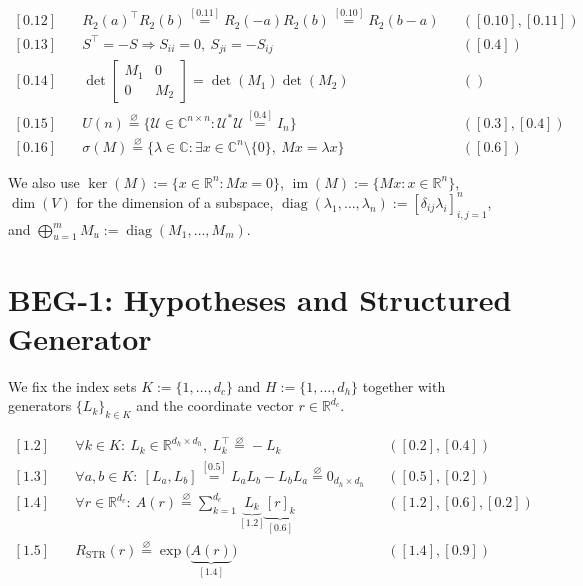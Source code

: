 \documentclass[11pt]{article}
\begin{document}
\begin{align}
\boxed{[0.12]}\quad & R_2(a)^\top R_2(b) \overset{[0.11]}{=} R_2(-a)R_2(b) \overset{[0.10]}{=} R_2(b-a) &&([0.10],[0.11])\\
\boxed{[0.13]}\quad & S^\top = -S \Longrightarrow S_{ii}=0,\ S_{ji}=-S_{ij} &&([0.4])\\
\boxed{[0.14]}\quad & \det \begin{bmatrix}M_1&0\\0&M_2\end{bmatrix} = \det(M_1)\det(M_2) &&({})\\
\boxed{[0.15]}\quad & U(n) \overset{\varnothing}{=} \Big\{\mathcal{U} \in \mathbb{C}^{n\times n} : \mathcal{U}^\ast \mathcal{U} \overset{[0.4]}{=} I_n\Big\} &&([0.3],[0.4])\\
\boxed{[0.16]}\quad & \sigma(M) \overset{\varnothing}{=} \{\lambda \in \mathbb{C} : \exists x \in \mathbb{C}^n\setminus\{0\},\ Mx = \lambda x\} &&([0.6])
\end{align}

We also use $\ker(M) := \{x \in \mathbb{R}^n : Mx = 0\}$, $\operatorname{im}(M) := \{Mx : x \in \mathbb{R}^n\}$, $\dim(V)$ for the dimension of a subspace, $\operatorname{diag}(\lambda_1,\dots,\lambda_n) := [\delta_{ij}\lambda_i]_{i,j=1}^n$, and $\bigoplus_{u=1}^m M_u := \operatorname{diag}(M_1,\dots,M_m)$.

\section{BEG-1: Hypotheses and Structured Generator}

We fix the index sets $K := \{1,\dots,d_c\}$ and $H := \{1,\dots,d_h\}$ together with generators $\{L_k\}_{k\in K}$ and the coordinate vector $r \in \mathbb{R}^{d_c}$.

\begin{align}
\boxed{[1.2]}\quad & \forall k \in K:\ L_k \in \mathbb{R}^{d_h\times d_h},\ L_k^\top \overset{\varnothing}{=} -L_k &&([0.2],[0.4])\\
\boxed{[1.3]}\quad & \forall a,b \in K:\ [L_a,L_b] \overset{[0.5]}{=} L_aL_b-L_bL_a \overset{\varnothing}{=} 0_{d_h\times d_h} &&([0.5],[0.2])\\
\boxed{[1.4]}\quad & \forall r \in \mathbb{R}^{d_c}:\ A(r) \overset{\varnothing}{=} \sum_{k=1}^{d_c} \underbrace{L_k}_{[1.2]}\underbrace{[r]_k}_{[0.6]} &&([1.2],[0.6],[0.2])\\
\boxed{[1.5]}\quad & R_{\mathrm{STR}}(r) \overset{\varnothing}{=} \exp\big(\underbrace{A(r)}_{[1.4]}\big) &&([1.4],[0.9])
\end{align}
\end{document}
